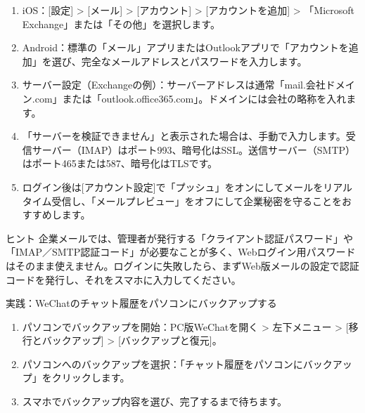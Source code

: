 
\begin{enumerate}
  \item iOS：[設定] > [メール] > [アカウント] > [アカウントを追加] > 「Microsoft Exchange」または「その他」を選択します。
  \item Android：標準の「メール」アプリまたはOutlookアプリで「アカウントを追加」を選び、完全なメールアドレスとパスワードを入力します。
  \item サーバー設定（Exchangeの例）：サーバーアドレスは通常「mail.会社ドメイン.com」または「outlook.office365.com」。ドメインには会社の略称を入れます。
  \item 「サーバーを検証できません」と表示された場合は、手動で入力します。受信サーバー（IMAP）はポート993、暗号化はSSL。送信サーバー（SMTP）はポート465または587、暗号化はTLSです。
  \item ログイン後は[アカウント設定]で「プッシュ」をオンにしてメールをリアルタイム受信し、「メールプレビュー」をオフにして企業秘密を守ることをおすすめします。
\end{enumerate}

\begin{tcbinfo}{ヒント}
企業メールでは、管理者が発行する「クライアント認証パスワード」や「IMAP／SMTP認証コード」が必要なことが多く、Webログイン用パスワードはそのまま使えません。ログインに失敗したら、まずWeb版メールの設定で認証コードを発行し、それをスマホに入力してください。

\end{tcbinfo}

\begin{tcbpractice}{実践：WeChatのチャット履歴をパソコンにバックアップする}
\begin{enumerate}
  \item パソコンでバックアップを開始：PC版WeChatを開く > 左下メニュー > [移行とバックアップ] > [バックアップと復元]。
  \item パソコンへのバックアップを選択：「チャット履歴をパソコンにバックアップ」をクリックします。
  \item スマホでバックアップ内容を選び、完了するまで待ちます。
\end{enumerate}

\end{tcbpractice}
